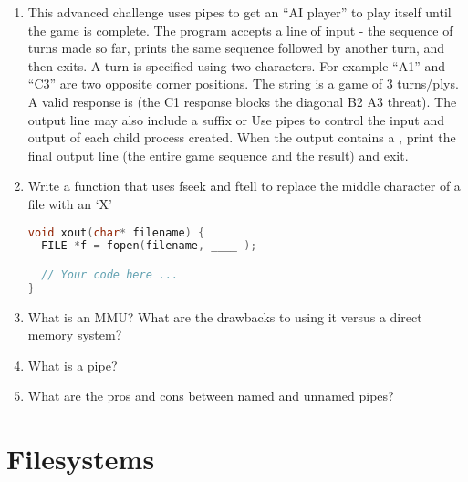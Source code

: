 \begin{enumerate}
\item This advanced challenge uses pipes to get an ``AI player'' to play itself until the game is complete. The program  accepts a line of input - the sequence of turns made so far, prints the same sequence followed by another turn, and then exits. A turn is specified using two characters. For example ``A1'' and ``C3'' are two opposite corner positions. The string  is a game of 3 turns/plys. A valid response is  (the C1 response blocks the diagonal B2 A3 threat). The output line may also include a suffix    or  Use pipes to control the input and output of each child process created. When the output contains a \keyword{-}, print the final output line (the entire game sequence and the result) and exit.

\item Write a function that uses fseek and ftell to replace the middle character of a file with an `X'

\begin{lstlisting}[language=C]
void xout(char* filename) {
  FILE *f = fopen(filename, ____ );

  // Your code here ...
}
\end{lstlisting}

\item What is an MMU? What are the drawbacks to using it versus a direct memory system?
\item What is a pipe?
\item What are the pros and cons between named and unnamed pipes?

\end{enumerate}

\section{Filesystems}

